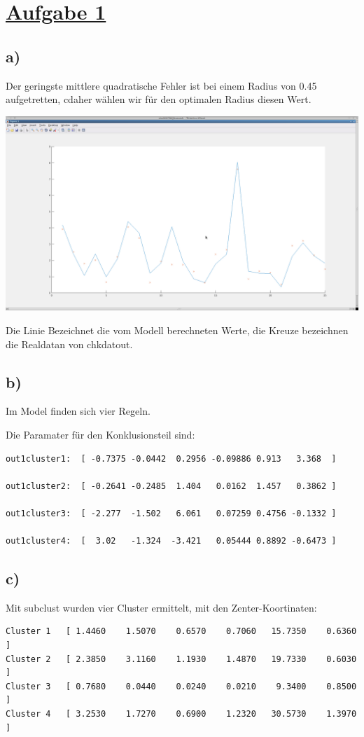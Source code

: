 \section*{\underline{Aufgabe 1}}

\subsection*{a)}

Der geringste mittlere quadratische Fehler ist bei einem Radius von 0.45 aufgetretten, cdaher wählen wir für den optimalen Radius diesen Wert.

\includegraphics[width=\textwidth]{part/S9-A1a-Plot}

Die Linie Bezeichnet die vom Modell berechneten Werte, die Kreuze bezeichnen die Realdatan von chkdatout.

\subsection*{b)}

Im Model finden sich vier Regeln.

Die Paramater für den Konklusionsteil sind:

\begin{verbatim}
out1cluster1:  [ -0.7375 -0.0442  0.2956 -0.09886 0.913   3.368  ]

out1cluster2:  [ -0.2641 -0.2485  1.404   0.0162  1.457   0.3862 ]

out1cluster3:  [ -2.277  -1.502   6.061   0.07259 0.4756 -0.1332 ]

out1cluster4:  [  3.02   -1.324  -3.421   0.05444 0.8892 -0.6473 ]
\end{verbatim}

\clearpage

\subsection*{c)}

Mit subclust wurden vier Cluster ermittelt, mit den Zenter-Koortinaten:

\begin{verbatim}
Cluster 1   [ 1.4460    1.5070    0.6570    0.7060   15.7350    0.6360 ]
Cluster 2   [ 2.3850    3.1160    1.1930    1.4870   19.7330    0.6030 ]
Cluster 3   [ 0.7680    0.0440    0.0240    0.0210    9.3400    0.8500 ]
Cluster 4   [ 3.2530    1.7270    0.6900    1.2320   30.5730    1.3970 ]
\end{verbatim}